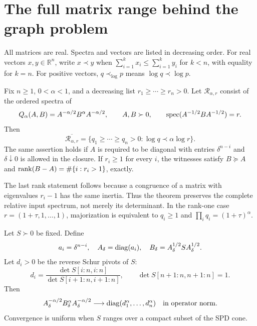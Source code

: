 \section{The full matrix range behind the graph problem}\label{ah:sec:araki-horn}
All matrices are real. Spectra and vectors are listed in decreasing
order. For real vectors $x,y\in\mathbb R^n$, write $x\prec y$ when
$\sum_{i=1}^k x_i\le\sum_{i=1}^k y_i$ for $k<n$, with equality
for $k=n$. For positive vectors, $q\prec_{\log}p$ means
$\log q\prec\log p$.

\begin{theorem}\label{ah:thm:range}
Fix $n\ge1$, $0<\alpha<1$, and a decreasing list
$r_1\ge\cdots\ge r_n>0$. Let $\mathcal R_{\alpha,r}$ consist of
the ordered spectra of
\[
 Q_\alpha(A,B)=A^{-\alpha/2}B^\alpha A^{-\alpha/2},
 \qquad A,B\succ0,
 \qquad \operatorname{spec}(A^{-1/2}BA^{-1/2})=r.
\]
Then
\[
 \overline{\mathcal R_{\alpha,r}}
 =\{q_1\ge\cdots\ge q_n>0:\log q\prec\alpha\log r\}.
\]
The same assertion holds if $A$ is required to be diagonal with entries
$\delta^{n-i}$ and $\delta\downarrow0$ is allowed in the closure.
If $r_i\ge1$ for every $i$, the witnesses satisfy $B\succeq A$ and
$\operatorname{rank}(B-A)=\#\{i:r_i>1\}$, exactly.
\end{theorem}

The last rank statement follows because a congruence of a matrix with
eigenvalues $r_i-1$ has the same inertia. Thus the theorem preserves
the complete relative input spectrum, not merely its determinant.
In the rank-one case $r=(1+\tau,1,\ldots,1)$, majorization is
equivalent to $q_i\ge1$ and $\prod_iq_i=(1+\tau)^\alpha$.

\begin{lemma}\label{ah:lem:pivots}
Let $S\succ0$ be fixed. Define
\[
 a_i=\delta^{n-i},\quad A_\delta=\operatorname{diag}(a_i),\quad
 B_\delta=A_\delta^{1/2}S A_\delta^{1/2}.
\]
Let $d_i>0$ be the reverse Schur pivots of $S$:
\[
 d_i=\frac{\det S[i:n,i:n]}{\det S[i+1:n,i+1:n]},
 \qquad\det S[n+1:n,n+1:n]=1.
\]
Then
\[
 A_\delta^{-\alpha/2}B_\delta^\alpha A_\delta^{-\alpha/2}
 \longrightarrow\operatorname{diag}(d_1^\alpha,\ldots,d_n^\alpha)
 \quad\text{in operator norm}.
\]
Convergence is uniform when $S$ ranges over a compact subset of the
SPD cone.
\end{lemma}

